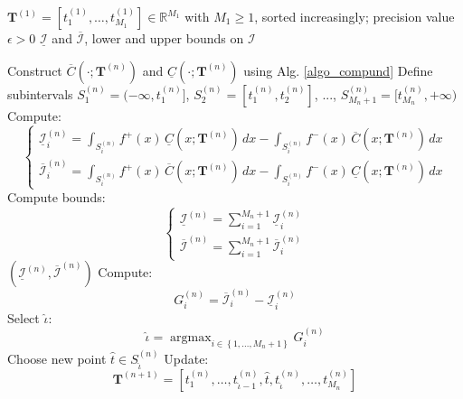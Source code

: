\documentclass[review]{elsarticle}
\newcommand{\Ic}{\mathcal{I}}
\begin{document}
\newpage
\begin{algorithm}[H]
\caption{Adaptive Tangency Point Selection}
\label{algo:tangency}
\begin{algorithmic}[1]
\Require $\mathbf{T}^{(1)} = [t_1^{(1)}, \dots, t_{M_1}^{(1)}] \in \mathbb{R}^{M_1}$ with $M_1 \geq 1$, sorted increasingly; precision value $\epsilon > 0$
\Ensure $\underline{\Ic}$ and $\overline{\Ic}$, lower and upper bounds on $\Ic$

    \State Construct $\overline{C}(\cdot; \mathbf{T}^{(n)})$ and $\underline{C}(\cdot; \mathbf{T}^{(n)})$ using Alg. \ref{algo_compund}
    \State Define subintervals $S_1^{(n)} = (-\infty, t_1^{(n)}]$, $S_2^{(n)} = [t_1^{(n)}, t_2^{(n)}]$, ..., $S_{M_n+1}^{(n)} = [t_{M_n}^{(n)}, +\infty)$
        \State Compute:
        \begin{equation}
        \begin{cases}
        \underline{\Ic}_i^{(n)} = \int_{ S_i^{(n)}} f^+(x)\, \underline{C}(x; \mathbf{T}^{(n)}) \, dx -\int_{S_i^{(n)}} f^-(x)\, \overline{C}(x; \mathbf{T}^{(n)}) \, dx \\
        \overline{\Ic}_i^{(n)} = \int_{S_i^{(n)}} f^+(x)\, \overline{C}(x; \mathbf{T}^{(n)}) \, dx - \int_{ S_i^{(n)}} f^-(x)\, \underline{C}(x; \mathbf{T}^{(n)}) \, dx
        \end{cases}
        \end{equation}
    \EndFor
    \State Compute bounds:
    \begin{equation}
    \begin{cases}
    \underline{\Ic}^{(n)} = \sum_{i=1}^{M_n+1} \underline{\Ic}_i^{(n)} \\
    \overline{\Ic}^{(n)} = \sum_{i=1}^{M_n+1} \overline{\Ic}_i^{(n)}
    \end{cases}
    \end{equation}
    \If{$\overline{\Ic}^{(n)} - \underline{\Ic}^{(n)} \leq \epsilon$}
        \State \Return $(\underline{\Ic}^{(n)}, \overline{\Ic}^{(n)})$
    \Else
            \State Compute:
            \begin{equation}
            G_i^{(n)} = \overline{\Ic}_i^{(n)} - \underline{\Ic}_i^{(n)}
            \end{equation}
        \EndFor
        \State Select $\hat{\iota}$:
        \begin{equation}
        \hat{\iota} = \operatorname{argmax}_{i \in \left\{1,\ldots,M_n+1\right\}} G_i^{(n)}
        \label{eq:iota}
        \end{equation}
        \State Choose new point $\hat{t} \in S_{\hat{\iota}}^{(n)}$
        \State Update:
        \begin{equation}
        \mathbf{T}^{(n+1)} = [t_1^{(n)}, \dots, t_{\hat{\iota}-1}^{(n)}, \hat{t}, t_{\hat{\iota}}^{(n)}, \dots, t_{M_n}^{(n)}]
        \end{equation}
    \EndIf
\EndFor
\end{algorithmic}
\end{algorithm}
\end{document}
